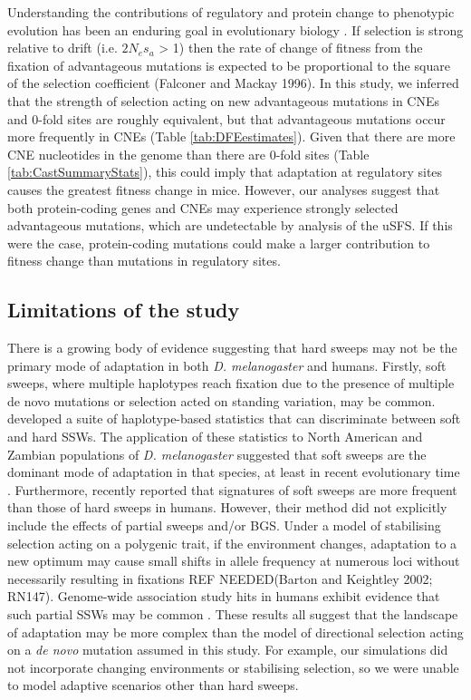 	Understanding the contributions of regulatory and protein change to phenotypic evolution has been an enduring goal in evolutionary biology \cite{RN347, RN346, RN348}. If selection is strong relative to drift (i.e. $2N_es_a$ > 1) then the rate of change of fitness from the fixation of advantageous mutations is expected to be proportional to the square of the selection coefficient (Falconer and Mackay 1996). In this study, we inferred that the strength of selection acting on new advantageous mutations in CNEs and 0-fold sites are roughly equivalent, but that advantageous mutations occur more frequently in CNEs (Table \ref{tab:DFEestimates}). Given that there are more CNE nucleotides in the genome than there are 0-fold sites (Table \ref{tab:CastSummaryStats}), this could imply that adaptation at regulatory sites causes the greatest fitness change in mice. However, our analyses suggest that both protein-coding genes and CNEs may experience strongly selected advantageous mutations, which are undetectable by analysis of the uSFS. If this were the case, protein-coding mutations could make a larger contribution to fitness change than mutations in regulatory sites.

\subsection{Limitations of the study}

	There is a growing body of evidence suggesting that hard sweeps may not be the primary mode of adaptation in both \textit{D. melanogaster} and humans. Firstly, soft sweeps, where multiple haplotypes reach fixation due to the presence of multiple de novo mutations or selection acted on standing variation, may be common. \cite{RN208} developed a suite of haplotype-based statistics that can discriminate between soft and hard SSWs. The application of these statistics to North American and Zambian populations of \textit{D. melanogaster} suggested that soft sweeps are the dominant mode of adaptation in that species, at least in recent evolutionary time \citep{RN208,RN303}. Furthermore, \cite{RN337} recently reported that signatures of soft sweeps are more frequent than those of hard sweeps in humans. However, their method did not explicitly include the effects of partial sweeps and/or BGS. Under a model of stabilising selection acting on a polygenic trait, if the environment changes, adaptation to a new optimum may cause small shifts in allele frequency at numerous loci without necessarily resulting in fixations REF NEEDED(Barton and Keightley 2002; RN147). Genome-wide association study hits in humans exhibit evidence that such partial SSWs may be common \citep{RN301}. These results all suggest that the landscape of adaptation may be more complex than the model of directional selection acting on a \textit{de novo} mutation assumed in this study. For example, our simulations did not incorporate changing environments or stabilising selection, so we were unable to model adaptive scenarios other than hard sweeps. 


